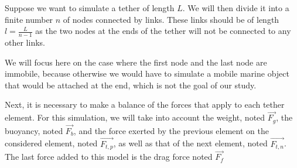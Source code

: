 Suppose we want to simulate a tether of length $L$. We will then divide it into a finite number $n$ of nodes connected by links. These links should be of length $l=\frac{L}{n-1}$ as the two nodes at the ends of the tether will not be connected to any other links.

We will focus here on the case where the first node and the last node are immobile, because otherwise we would have to simulate a mobile marine object that would be attached at the end, which is not the goal of our study.

Next, it is necessary to make a balance of the forces that apply to each tether element. For this simulation, we will take into account the weight, noted $\overrightarrow{F_g}$, the buoyancy, noted $\overrightarrow{F_b}$, and the force exerted by the previous element on the considered element, noted $\overrightarrow{F_{t, p}}$, as well as that of the next element, noted $\overrightarrow{F_{t, n}}$. The last force added to this model is the drag force noted $\overrightarrow{F_f}$


